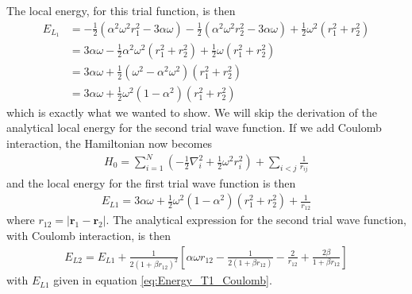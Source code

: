 \documentclass[12pt]{article}
\begin{document}
The local energy, for this trial function, is then
\begin{align}
E_{L_1} &= -\frac{1}{2} (\alpha^2 \omega^2 r_1^2 - 3\alpha \omega)  - \frac{1}{2} (\alpha^2 \omega^2 r_2^2 - 3\alpha \omega) + \frac{1}{2}\omega^2(r_1^2 + r_2^2) \nonumber \\
&= 3 \alpha \omega  - \frac{1}{2}\alpha^2 \omega^2 (r_1^2 + r_2^2) + \frac{1}{2}\omega(r_1^2 + r_2^2) \nonumber \\
&= 3\alpha \omega + \frac{1}{2}(\omega^2 - \alpha^2 \omega^2)(r_1^2 + r_2^2) \nonumber \\
&= 3 \alpha \omega +  \frac{1}{2}\omega^2(1-\alpha^2)(r_1^2 + r_2^2)
\label{eq:Energy_T1}
\end{align}
which is exactly what we wanted to show. We will skip the derivation of the analytical local energy for the second trial wave function. If we add Coulomb interaction, the Hamiltonian now becomes
\begin{align*}
H_0 = \displaystyle \sum_{i=1}^N\left(-\frac{1}{2}\nabla_i^2 + \frac{1}{2}\omega^2r_i^2 \right) + \sum_{i<j}\frac{1}{r_{ij}}
\end{align*}
and the local energy for the first trial wave function is then
\begin{align}
E_{L1} = 3 \alpha \omega +  \frac{1}{2}\omega^2(1-\alpha^2)(r_1^2 + r_2^2) + \frac{1}{r_{12}}
\label{eq:Energy_T1_Coulomb}
\end{align}
where $r_{12}= |\mathbf{r}_1 - \mathbf{r}_2|$. The analytical expression for the second trial wave function, with Coulomb interaction, is then
\begin{align}
E_{L2} = E_{L1} + \frac{1}{2(1+\beta r_{12})^2}\left[\alpha \omega r_{12} - \frac{1}{2(1+\beta r_{12})} - \frac{2}{r_{12}} + \frac{2\beta}{1+\beta r_{12}} \right]
\label{eq:Energy_T2_Coulomb}
\end{align}
with $E_{L1}$ given in equation \ref{eq:Energy_T1_Coulomb}.
\end{document}
